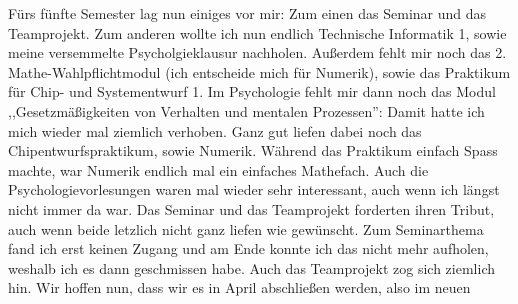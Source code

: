 \begin{multicols}{2}

Fürs fünfte Semester lag nun einiges vor mir: Zum einen das Seminar
und das Teamprojekt. Zum anderen wollte ich nun 
endlich Technische Informatik 1, sowie meine versemmelte Psycholgieklausur nachholen. Außerdem fehlt mir
noch das 2. Mathe-Wahlpflichtmodul (ich entscheide mich für Numerik), sowie  das Praktikum für Chip-
und Systementwurf 1. Im Psychologie fehlt mir dann noch das Modul ,,Gesetzmäßigkeiten von Verhalten und mentalen Prozessen'':
Damit hatte ich mich wieder mal ziemlich verhoben. Ganz gut liefen
dabei noch das Chipentwurfspraktikum, sowie Numerik. Während das
Praktikum einfach Spass machte, war Numerik endlich mal ein einfaches
Mathefach. Auch die Psychologievorlesungen waren mal wieder sehr
interessant, auch wenn ich längst nicht immer da war.  Das Seminar und
das Teamprojekt forderten ihren Tribut, auch wenn beide letzlich nicht
ganz liefen wie gewünscht. Zum Seminarthema fand ich erst keinen
Zugang und am Ende konnte ich das nicht mehr aufholen, weshalb ich es
dann geschmissen habe. Auch das Teamprojekt zog sich ziemlich hin. Wir
hoffen nun, dass wir es in April abschließen werden, also im neuen

\end{multicols}
